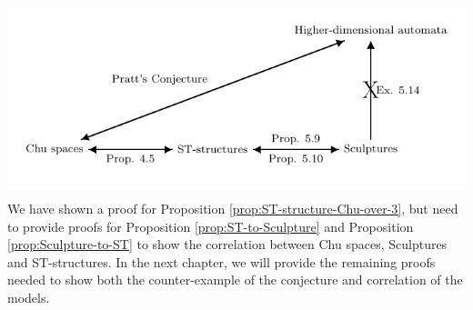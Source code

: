     \begin{center}
        \includegraphics[scale=1]{Figures/4.Relationship-with-other-models-of-concurrency/Chu-spaces-and-ST-structures/argument-diagram.pdf}
    \end{center}
    
    We have shown a proof for Proposition \ref{prop:ST-structure-Chu-over-3}, but need to provide proofs for Proposition \ref{prop:ST-to-Sculpture} and Proposition \ref{prop:Sculpture-to-ST} to show the correlation between Chu spaces, Sculptures and ST-structures. In the next chapter, we will provide the remaining proofs needed to show both the counter-example of the conjecture and correlation of the models.